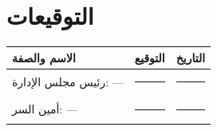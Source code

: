 \documentclass[12pt,a4paper]{article}
\begin{document}
\section*{التوقيعات}

\begin{table}[H]
\centering
\renewcommand{\arraystretch}{2.5}
\begin{tabularx}{\textwidth}{L{5cm} X X}
\toprule
\textbf{الاسم والصفة} & \textbf{التوقيع} & \textbf{التاريخ} \\
\midrule
رئيس مجلس الإدارة: --- & \rule{4cm}{0.4pt} & \rule{3cm}{0.4pt} \\
أمين السر: --- & \rule{4cm}{0.4pt} & \rule{3cm}{0.4pt} \\
\bottomrule
\end{tabularx}
\end{table}
\end{document}
